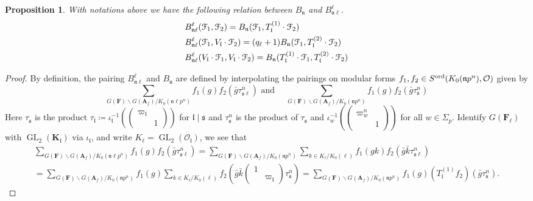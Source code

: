 \documentclass[leqno]{amsart}
\newtheorem{prop}[thm]{Proposition}
\theoremstyle{definition}
\theoremstyle{remark}
\newcommand{\smat}[1]{\left(\begin{smallmatrix} #1 \end{smallmatrix}\right)}
\newcommand{\oo}{\mathcal{O}}
\newcommand{\A}{\mathbf A}
\DeclareMathOperator{\GL}{GL}
\newcommand{\fs}{\mathfrak{s}}
\newcommand{\fn}{\mathfrak{n}}
\newcommand{\fl}{\mathfrak{l}}
\newcommand{\F}{{\mathbf{F}}} %
\newcommand{\K}{{\mathbf{K}}} %
\newcommand{\euF}{\EuScript{F}} %
\newcommand{\ord}{\textnormal{ord}} %
\begin{document}
\begin{prop}\label{prop:pair_at_deff_level}
	With notations above we have the following
	relation between $B_{\fn}$
	and $B_{\fn\ell}^\ell$.
	\begin{align*}
	&B_{\fn\ell}^{\ell}(\euF_1,\euF_2)=
	B_{\fn}(\euF_1,T_{\fl}^{(1)}\cdot \euF_2)\\
	&B_{\fn\ell}^{\ell}(\euF_1,V_{\fl}\cdot\euF_2)=
	(q_\ell+1) B_{\fn}(\euF_1,
	T_{\fl}^{(2)}\cdot\euF_2)\\
	&B_{\fn\ell}^\ell
	(V_{\fl}\cdot \euF_1,V_{\fl}\cdot\euF_2)=
	B_{\fn} (T_{\fl}^{(1)}\cdot\euF_1,
	T_{\fl}^{(2)}\cdot \euF_2)
	\end{align*}
\end{prop}
\begin{proof}
	By definition,
	the pairing $B_{\fn\ell}^\ell$
	and $B_{\fn}$ are defined by 
	interpolating the pairings 
	on modular forms
	$f_1,f_2\in S^{\ord}(K_0(\fn p^n),\oo)$
	given by 
	\[
	\sum_{G(\F)\backslash G(\A_f)/K_0(\fn\ell p^n)}
	f_1(g)f_2(\bar{g}\tau_{\fs\ell}^n)\text{ and }\quad
	\sum_{G(\F)\backslash G(\A_f)/K_0(\fn p^n)}
	f_1(g)f_2(\bar{g}\tau_{\fs}^n)
	\]
	Here $\tau_{\fs}$ is the product 
	$\tau_\fl\coloneqq
	\iota_{\fl}^{-1}(\smat{\varpi_\fl&\\&1})$
	for $\fl\mid \fs$
	and  $\tau_{\fs}^n$ is the product
	of $\tau_{\fs}$ and 
	$\iota_{w}^{-1}(\smat{\varpi_w^n&\\&1})$
	for all $w\in \Sigma_p$.
	Identify $G(\F_\ell)$ with  $\GL_2(\K_\fl)$
	via  $\iota_\fl$, and 
	write $K_\ell=\GL_2(\oo_\fl)$, we see that 
	\begin{multline*}
	\sum_{G(\F)\backslash G(\A_f)/K_0(\fn\ell p^n)}
	f_1(g)f_2(\bar{g}\tau_{\fs\ell}^n)=
	\sum_{G(\F)\backslash G(\A_f)/K_0(\fn p^n)}
	\sum_{k\in K_\ell/K_0(\ell)}
	f_1(gk)f_2(\bar{g}\bar{k}\tau_{\fs\ell}^n)\\=
	\sum_{G(\F)\backslash G(\A_f)/K_0(\fn p^n)} f_1(g)
	\sum_{k\in K_\ell/K_0(\ell)}
	f_2(\bar{g}\bar{k}\smat{1&\\&\varpi_\fl}
	\tau_{\fs}^n)=
	\sum_{G(\F)\backslash G(\A_f)/K_0(\fn p^n)} f_1(g)
	(T_\fl^{(1)}f_2)(\bar{g}\tau_{\fs}^n).
	\end{multline*}

\end{proof}
\end{document}
